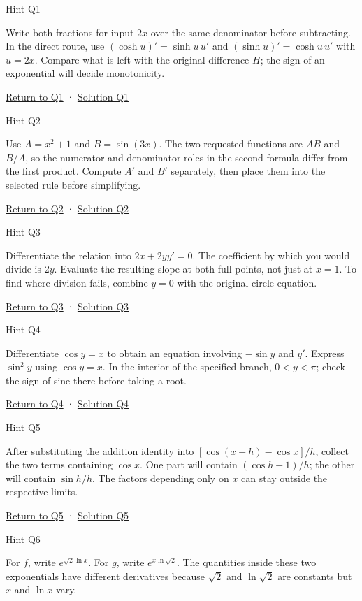 \documentclass[
  11pt,
]{article}
\providecommand{\lt}{<}
\begin{document}
Hint Q1

Write both fractions for input \(2x\) over the same denominator before
subtracting. In the direct route, use \((\cosh u)'=\sinh u\,u'\) and
\((\sinh u)'=\cosh u\,u'\) with \(u=2x\). Compare what is left with the
original difference \(H\); the sign of an exponential will decide
monotonicity.

\protect\hyperlink{task-q1}{Return to Q1} ·
\protect\hyperlink{solution-q1}{Solution Q1}

Hint Q2

Use \(A=x^2+1\) and \(B=\sin(3x)\). The two requested functions are
\(AB\) and \(B/A\), so the numerator and denominator roles in the second
formula differ from the first product. Compute \(A'\) and \(B'\)
separately, then place them into the selected rule before simplifying.

\protect\hyperlink{task-q2}{Return to Q2} ·
\protect\hyperlink{solution-q2}{Solution Q2}

Hint Q3

Differentiate the relation into \(2x+2yy'=0\). The coefficient by which
you would divide is \(2y\). Evaluate the resulting slope at both full
points, not just at \(x=1\). To find where division fails, combine
\(y=0\) with the original circle equation.

\protect\hyperlink{task-q3}{Return to Q3} ·
\protect\hyperlink{solution-q3}{Solution Q3}

Hint Q4

Differentiate \(\cos y=x\) to obtain an equation involving \(-\sin y\)
and \(y'\). Express \(\sin^2y\) using \(\cos y=x\). In the interior of
the specified branch, \(0\lt y\lt \pi\); check the sign of sine there
before taking a root.

\protect\hyperlink{task-q4}{Return to Q4} ·
\protect\hyperlink{solution-q4}{Solution Q4}

Hint Q5

After substituting the addition identity into \([\cos(x+h)-\cos x]/h\),
collect the two terms containing \(\cos x\). One part will contain
\((\cos h-1)/h\); the other will contain \(\sin h/h\). The factors
depending only on \(x\) can stay outside the respective limits.

\protect\hyperlink{task-q5}{Return to Q5} ·
\protect\hyperlink{solution-q5}{Solution Q5}

Hint Q6

For \(f\), write \(e^{\sqrt2\ln x}\). For \(g\), write
\(e^{x\ln\sqrt2}\). The quantities inside these two exponentials have
different derivatives because \(\sqrt2\) and \(\ln\sqrt2\) are constants
but \(x\) and \(\ln x\) vary.
\end{document}
